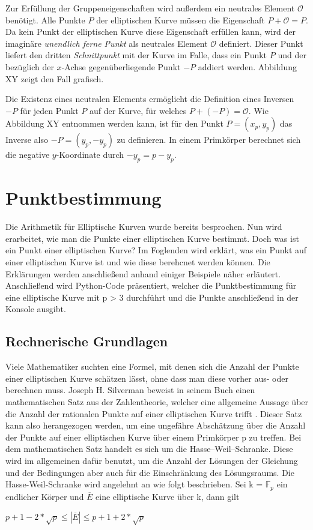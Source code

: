Zur Erfüllung der Gruppeneigenschaften wird außerdem ein neutrales Element $\mathcal{O}$ benötigt. Alle Punkte $P$ der elliptischen Kurve müssen die Eigenschaft $P + \mathcal{O} = P$. Da kein Punkt der elliptischen Kurve diese Eigenschaft erfüllen kann, wird der imaginäre \textit{unendlich ferne Punkt} als neutrales Element $\mathcal{O}$ definiert. Dieser Punkt liefert den dritten \textit{Schnittpunkt} mit der Kurve im Falle, dass ein Punkt $P$ und der bezüglich der $x$-Achse gegenüberliegende Punkt $-P$ addiert werden. Abbildung XY zeigt den Fall grafisch.

Die Existenz eines neutralen Elements ermöglicht die Definition eines Inversen $-P$ für jeden Punkt $P$ auf der Kurve, für welches $P + (-P) = \mathcal{O}$. Wie Abbildung XY  entnommen werden kann, ist für den Punkt $P = (x_p, y_p)$ das Inverse also $-P = (y_p, -y_p)$ zu definieren. In einem Primkörper berechnet sich die negative $y$-Koordinate durch $-y_p = p - y_p$.
 
\section{Punktbestimmung}
Die Arithmetik für Elliptische Kurven wurde bereits besprochen. Nun wird erarbeitet, wie man die Punkte einer elliptischen Kurve bestimmt. Doch was ist ein Punkt einer elliptischen Kurve? Im Foglenden wird erklärt, was ein Punkt auf einer elliptischen Kurve ist und wie diese berehcnet werden können. Die Erklärungen werden anschließend anhand einiger Beispiele näher erläutert. Anschließend wird Python-Code präsentiert, welcher die Punktbestimmung für eine elliptische Kurve mit p > 3 durchführt und die Punkte anschließend in der Konsole ausgibt.

\subsection{Rechnerische Grundlagen}
Viele Mathematiker suchten eine Formel, mit denen sich die Anzahl der Punkte einer elliptischen Kurve schätzen lässt, ohne dass man diese vorher aus- oder berechnen muss. Joseph H. Silverman beweist in seinem Buch einen mathematischen Satz aus der Zahlentheorie, welcher eine allgemeine Aussage über die Anzahl der rationalen Punkte auf einer elliptischen Kurve trifft \cite[vgl.][S. 138]{silverman}. Dieser Satz kann also herangezogen werden, um eine ungefähre Abschätzung über die Anzahl der Punkte auf einer elliptischen Kurve über einem Primkörper p zu treffen. Bei dem mathematischen Satz handelt es sich um die Hasse–Weil–Schranke. Diese wird im allgemeinen dafür benutzt, um die Anzahl der Lösungen der Gleichung und der Bedingungen aber auch für die Einschränkung des Lösungsraums. Die Hasse-Weil-Schranke wird angelehnt an \cite[vgl.][S. 181]{reinholdhuebl} wie folgt beschrieben. Sei k = $\mathbb{F}_p$ ein endlicher Körper und $\overline{E}$ eine elliptische Kurve über k, dann gilt
\begin{center}
$p + 1 - 2 * \sqrt{p} \leq | \overline{E} | \leq p + 1 + 2 * \sqrt{p}$
\end{center} 

